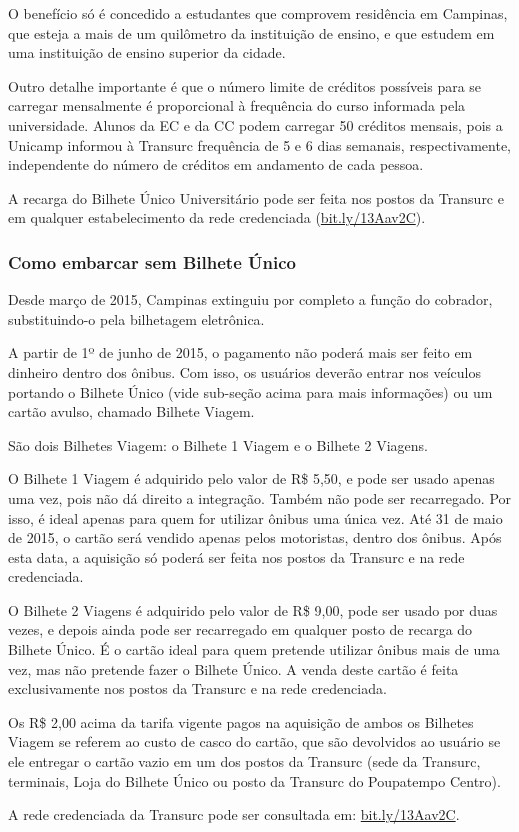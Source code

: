 O benefício só é concedido a estudantes que comprovem residência em Campinas,
que esteja a mais de um quilômetro da instituição de ensino, e que estudem em
uma instituição de ensino superior da cidade.

Outro detalhe importante é que o número limite de créditos possíveis para se
carregar mensalmente é proporcional à frequência do curso informada pela
universidade. Alunos da EC e da CC podem carregar 50 créditos mensais, pois
a Unicamp informou à Transurc frequência de 5 e 6 dias semanais,
respectivamente, independente do número de créditos em andamento de cada
pessoa.

A recarga do Bilhete Único Universitário pode ser feita nos postos da
Transurc e em qualquer estabelecimento da rede credenciada
(\url{bit.ly/13Aav2C}).

\subsubsection*{Como embarcar sem Bilhete Único}

Desde março de 2015, Campinas extinguiu por completo a função do cobrador,
substituindo-o pela bilhetagem eletrônica.

A partir de 1º de junho de 2015, o pagamento não poderá mais ser feito em
dinheiro dentro dos ônibus. Com isso, os usuários deverão entrar nos veículos
portando o Bilhete Único (vide sub-seção acima para mais informações) ou um
cartão avulso, chamado Bilhete Viagem.

São dois Bilhetes Viagem: o Bilhete 1 Viagem e o Bilhete 2 Viagens.

O Bilhete 1 Viagem é adquirido pelo valor de R\$ 5,50, e pode ser usado apenas
uma vez, pois não dá direito a integração. Também não pode ser recarregado.  Por
isso, é ideal apenas para quem for utilizar ônibus uma única vez. Até 31 de maio
de 2015, o cartão será vendido apenas pelos motoristas, dentro dos ônibus. Após
esta data, a aquisição só poderá ser feita nos postos da Transurc e na rede
credenciada.

O Bilhete 2 Viagens é adquirido pelo valor de R\$ 9,00, pode ser usado por duas
vezes, e depois ainda pode ser recarregado em qualquer posto de recarga do
Bilhete Único. É o cartão ideal para quem pretende utilizar ônibus mais de uma
vez, mas não pretende fazer o Bilhete Único. A venda deste cartão é feita
exclusivamente nos postos da Transurc e na rede credenciada.

Os R\$ 2,00 acima da tarifa vigente pagos na aquisição de ambos os Bilhetes
Viagem se referem ao custo de casco do cartão, que são devolvidos ao usuário se
ele entregar o cartão vazio em um dos postos da Transurc (sede da Transurc,
terminais, Loja do Bilhete Único ou posto da Transurc do Poupatempo Centro).

A rede credenciada da Transurc pode ser consultada em: \url{bit.ly/13Aav2C}.
